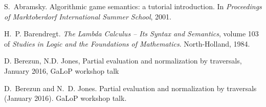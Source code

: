\documentclass[xchauthor,chkrefs,GCNS,amsmath,amsthm,rotating,leaveRGB]{tcsg}
\theoremstyle{plain}
\theoremstyle{definition}
\begin{document}
%
\begin{backmatter}%
\begin{thebibliography}{}

\begin{bsubitem}
\begin{bcontribution}%
\end{bcontribution}
\begin{bhost}
\begin{beditedbook}
\end{beditedbook}
\end{bhost}
\end{bsubitem}
%
\OrigBibText
S.~Abramsky.
 Algorithmic game semantics: a tutorial introduction.
 In \emph{Proceedings of Marktoberdorf International Summer School},
 2001.
\endOrigBibText
{}%
\endbibitem

\begin{bsubitem}
\begin{bcontribution}%
\end{bcontribution}
\begin{bhost}
\begin{bbook}
\end{bbook}
\end{bhost}
\end{bsubitem}
%
\OrigBibText
H.~P. Barendregt.
 \emph{{The Lambda Calculus -- Its Syntax and Semantics}}, volume 103
 of \emph{Studies in Logic and the Foundations of Mathematics}.
 North-Holland, 1984.
\endOrigBibText
{}%
\endbibitem

\begin{botherref}
D. Berezun,
N.D. Jones,
Partial evaluation and normalization by traversals,
January 2016,
Ga{L}o{P} workshop talk
\end{botherref}
%
\OrigBibText
D.~Berezun and N.~D. Jones.
 Partial evaluation and normalization by traversals (January 2016).
 Ga{L}o{P} workshop talk.
\endOrigBibText
{}%
\endbibitem


\end{thebibliography}
\end{backmatter}
\end{document}
